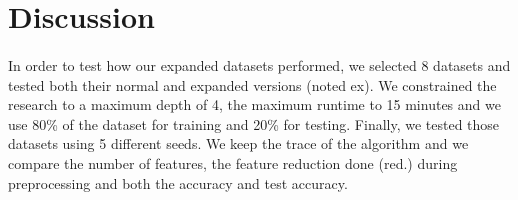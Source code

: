 \documentclass[12pt]{report}
\theoremstyle{definition}
\theoremstyle{definition}
\theoremstyle{definition}
\begin{document}
\section{Discussion}
\paragraph{} In order to test how our expanded datasets performed, we selected 8 datasets and tested both their normal
and expanded versions (noted ex). We constrained the research to a maximum depth of 4, the maximum runtime to 15 minutes
and we use 80\% of the dataset for training and 20\% for testing. Finally, we tested those datasets using 5 different
seeds. We keep the trace of the algorithm and we compare the number of features, the feature reduction done (red.) during
preprocessing and both the accuracy and test accuracy.
\end{document}
